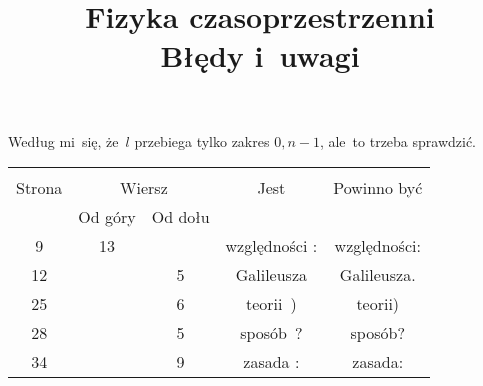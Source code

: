 \documentclass[a4paper,11pt]{article}
\title{Fizyka czasoprzestrzenni \\
  Błędy i~uwagi}
\begin{document}





\maketitle %











\start {} Według mi~się, że~$l$ przebiega tylko zakres
$0, n - 1$, ale~to trzeba sprawdzić.

\vspace{\spaceFour}



\start {}

\vspace{\spaceFour}



\start {}







\begin{center}

  \begin{tabular}{|c|c|c|c|c|}
    \hline
    & \multicolumn{2}{c|}{} & & \\
    Strona & \multicolumn{2}{c|}{Wiersz} & Jest
                              & Powinno być \\ \cline{2-3}
    & Od góry & Od dołu & & \\
    \hline
    9   & 13 & & względności : & względności: \\
    12  & &  5 & Galileusza & Galileusza. \\
    25  & &  6 & teorii~) & teorii) \\
    28  & &  5 & sposób~? & sposób? \\
    34  & &  9 & zasada : & zasada: \\
    \hline
  \end{tabular}

\end{center}
\end{document}

